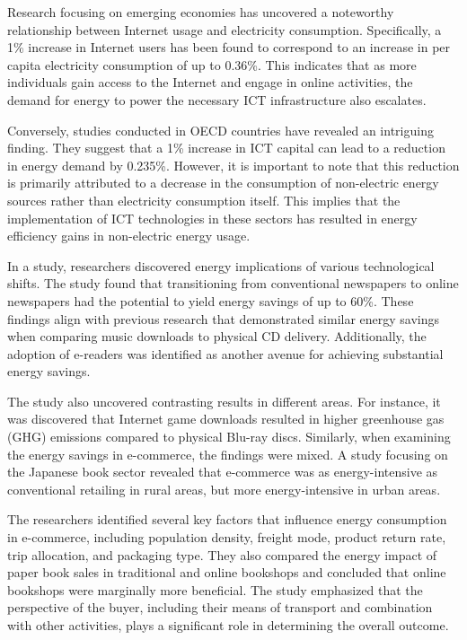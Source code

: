 \documentclass[
  a4paper,  %
  twoside,  %
  bibliography=totoc,
  headsepline,
  cleardoublepage=empty,
  parskip=half,
  draft=false
]{scrbook}
\begin{document}
Research focusing on emerging economies has uncovered a noteworthy relationship between Internet usage and electricity consumption. Specifically, a 1\% increase in Internet users has been found to correspond to an increase in per capita electricity consumption of up to 0.36\%\cite{rahimi2017internet}. This indicates that as more individuals gain access to the Internet and engage in online activities, the demand for energy to power the necessary ICT infrastructure also escalates.

Conversely, studies conducted in OECD countries have revealed an intriguing finding. They suggest that a 1\% increase in ICT capital can lead to a reduction in energy demand by 0.235\%\cite{lange2020digitalization}. However, it is important to note that this reduction is primarily attributed to a decrease in the consumption of non-electric energy sources rather than electricity consumption itself. This implies that the implementation of ICT technologies in these sectors has resulted in energy efficiency gains in non-electric energy usage.


In a study, researchers discovered energy implications of various technological shifts. The study found that transitioning from conventional newspapers to online newspapers had the potential to yield energy savings of up to 60\%\cite{lange2020digitalization}. These findings align with previous research that demonstrated similar energy savings when comparing music downloads to physical CD delivery. Additionally, the adoption of e-readers was identified as another avenue for achieving substantial energy savings.

The study also uncovered contrasting results in different areas. For instance, it was discovered that Internet game downloads resulted in higher greenhouse gas (GHG) emissions compared to physical Blu-ray discs\cite{lange2020digitalization}. Similarly, when examining the energy savings in e-commerce, the findings were mixed. A study focusing on the Japanese book sector revealed that e-commerce was as energy-intensive as conventional retailing in rural areas, but more energy-intensive in urban areas.

The researchers identified several key factors that influence energy consumption in e-commerce, including population density, freight mode, product return rate, trip allocation, and packaging type\cite{zaharia2019factors}. They also compared the energy impact of paper book sales in traditional and online bookshops \cite{lange2020digitalization} and concluded that online bookshops were marginally more beneficial. The study emphasized that the perspective of the buyer, including their means of transport and combination with other activities, plays a significant role in determining the overall outcome.
\end{document}
